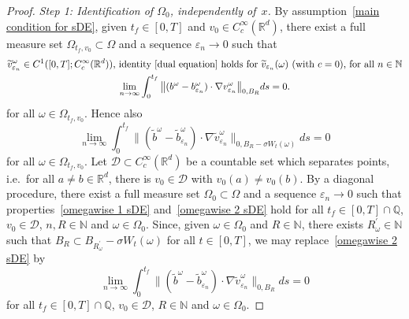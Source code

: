 \documentclass[a4paper,10pt]{article}
\newcommand\1{\mathbbm{1}}
\newcommand{\eps}{\varepsilon}
\numberwithin{equation}{section}
\begin{document}
\begin{proof}
\emph{Step 1: Identification of $\Omega_0$, independently of~$x$.}
By assumption~\eqref{main condition for sDE}, given $t_{f}\in [0,T]  $ and $v_{0}\in C_{c}^{\infty}(\mathbb{R}^{d})$, there exist a full measure set $\Omega_{t_{f},v_{0}} \subset\Omega$ and a sequence $\eps_{n}\rightarrow0$ such that
\begin{gather}
\widetilde{v}_{\eps_{n}}^\omega  \in C^{1}([
0,T]  ;C_{c}^{\infty}(\mathbb{R}^{d}))  \text{, identity~\eqref{dual equation} holds for~}\widetilde{v}_{\eps_n}(\omega) \text{ (with $c=0$), for all $n \in \mathbb{N}$}
\label{omegawise 1 sDE} \\
\lim_{n\rightarrow\infty}\int_{0}^{t_{f}} \big\|(  b^\omega  -b_{\eps_{n}}^\omega  )  \cdot\nabla
v_{\eps_{n}}^\omega \big\|_{0,B_R}ds=0 . \nonumber
\end{gather}
for all $\omega\in\Omega_{t_{f},v_{0}}$. Hence also
\begin{equation}
\lim_{n\rightarrow\infty}\int_{0}^{t_{f}} \big\| ( \widetilde{b}^\omega  -\widetilde{b}_{\eps_{n}}^\omega )  \cdot\nabla\widetilde{v}_{\eps_{n}}^\omega \big\|_{0,B_{R}-\sigma W_{t} (\omega)} ds=0 \label{omegawise 2 sDE}
\end{equation}
for all $\omega\in\Omega_{t_{f},v_{0}}$. Let $\mathcal{D}\subset C_{c}^{\infty}(\mathbb{R}^{d})$ be a countable set which separates points, i.e.~for all $a\neq b\in\mathbb{R}^{d}$, there is $v_{0}\in\mathcal{D}$ with $v_{0}(a) \neq v_{0}(b)$. By a diagonal procedure, there exist a full measure set $\Omega_{0}\subset\Omega$ and a sequence $\eps_{n}\rightarrow0$ such that properties~\eqref{omegawise 1 sDE} and~\eqref{omegawise 2 sDE} hold for all $t_{f}\in [0,T]  \cap\mathbb{Q}$, $v_{0}\in\mathcal{D}$, $n,R\in\mathbb{N}$ and $\omega\in \Omega_{0}$. Since, given $\omega\in \Omega_{0}$ and $R\in\mathbb{N}$, there exists $R_{\omega}^{\prime}\in\mathbb{N}$ such that $B_{R} \subset B_{R_{\omega }^{\prime}} -\sigma W_{t}(\omega)$ for all $t\in [0,T]  $, we may replace~\eqref{omegawise 2 sDE} by
\begin{equation}
\lim_{n\rightarrow\infty}\int_{0}^{t_{f}} \big\| (\widetilde{b}^\omega  -\widetilde{b}_{\eps_{n}}^\omega ) \cdot\nabla\widetilde{v}_{\eps_{n}}^\omega \big\|_{0,B_R}ds=0
\label{omegawise 2 bis sDE}
\end{equation}
for all $t_{f}\in [0,T]  \cap\mathbb{Q}$, $v_{0}\in\mathcal{D}$,
$R\in\mathbb{N}$ and $\omega\in \Omega_0$.


\end{proof}
\end{document}
